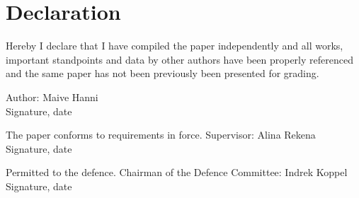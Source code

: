 \chapter*{Declaration}
\thispagestyle{empty}

Hereby I declare that I have compiled the paper independently and all works, important standpoints and data by other authors have been properly referenced and the same paper has not been previously been presented for grading.

Author: Maive Hanni \\
Signature, date


\vspace{2cm}

The paper conforms to requirements in force. \newline
Supervisor: Alina Rekena \\
Signature, date

\vspace{5cm}

Permitted to the defence. 
Chairman of the Defence Committee: Indrek Koppel \\
Signature, date

